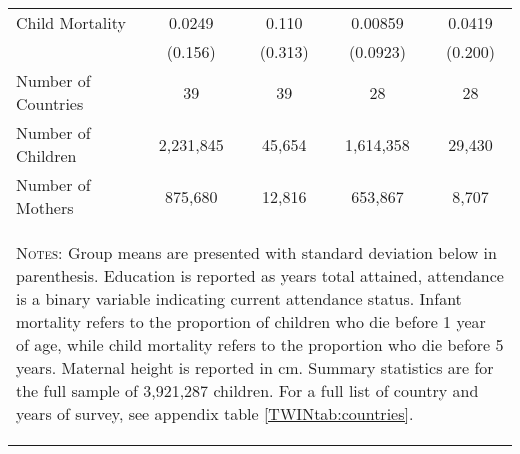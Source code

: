 \begin{table}[htpb!]
\begin{center}
\begin{tabular}{lcccc}
Child Mortality&0.0249&0.110&0.00859&0.0419\\
&(0.156)&(0.313)&(0.0923)&(0.200)\\
\midrule
Number of Countries & 39&39  & 28&28  \\
Number of Children &2,231,845 &45,654 &1,614,358 &29,430 \\
Number of Mothers &875,680 &12,816 &653,867 &8,707 \\
\midrule
\multicolumn{5}{p{11.5cm}}{\begin{footnotesize}\textsc{Notes:}  Group means are presented with standard deviation below in parenthesis.  Education is reported as years total attained, attendance is a binary variable indicating current attendance status.  Infant mortality refers to the proportion of children who die before 1 year of age, while child mortality refers to the proportion who die before 5 years.  Maternal height is reported in cm.  Summary statistics are for the full sample of 3,921,287 children.  For a full list of country and years of survey, see appendix table \ref{TWINtab:countries}.\end{footnotesize}} \\ \bottomrule \end{tabular}\end{center}\end{table}